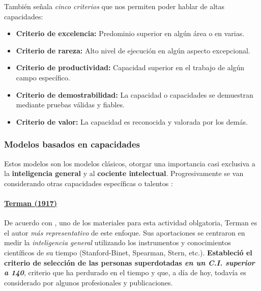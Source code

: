\documentclass[12pt, a4paper]{article}
\begin{document}
	
	También señala \textit{cinco criterios} que nos permiten poder hablar de altas capacidades:
	
	\begin{itemize}[noitemsep]
		\item \textbf{Criterio de excelencia:} Predominio superior en algún área o en varias.
		\item \textbf{Criterio de rareza:} Alto nivel de ejecución en algún aspecto excepcional.
		\item \textbf{Criterio de productividad:} Capacidad superior en el trabajo de algún campo específico.
		\item \textbf{Criterio de demostrabilidad:} La capacidad o capacidades se demuestran mediante pruebas válidas y fiables.
		\item \textbf{Criterio de valor:} La capacidad es reconocida y valorada por los demás.
	\end{itemize}
	
	
	
	
	
	
	
	
	
	
	
	
	
	\subsubsection{Modelos basados en capacidades}
	
	Estos modelos son los modelos clásicos, otorgar una importancia
	casi exclusiva a la \textbf{inteligencia general} y al \textbf{cociente intelectual}. Progresivamente se van considerando
	otras capacidades específicas o talentos  \parencite{Arocas2002OrientPsicopedGVA}:
	
	
	\paragraph{\underline{Terman (1917)}}
	
	De acuerdo con \textcite{Arocas2002OrientPsicopedGVA}, uno de los materiales para esta actividad oblgatoria, Terman es el autor \textit{más representativo} de este enfoque. Sus aportaciones se centraron en
	medir la \textit{inteligencia general} utilizando los instrumentos y conocimientos científicos de su tiempo (Stanford-Binet, Spearman, Stern, etc.). \textbf{Estableció el criterio de selección de las personas superdotadas \textit{en un C.I. superior a 140}}, criterio que ha perdurado en el tiempo y que, a día de hoy, todavía es considerado por algunos profesionales y publicaciones.
	
\end{document}
